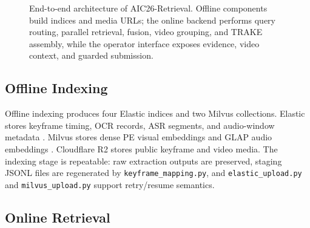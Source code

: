 \documentclass[conference]{IEEEtran}
\newcommand{\sys}{AIC26-Retrieval}
\begin{document}
\begin{figure}[t]
{
}
\caption{End-to-end architecture of \sys. Offline components build indices and
media URLs; the online backend performs query routing, parallel retrieval,
fusion, video grouping, and TRAKE assembly, while the operator interface exposes
evidence, video context, and guarded submission.}
\label{fig:system-overview}
\end{figure}

\subsection{Offline Indexing}

Offline indexing produces four Elastic indices and two Milvus collections.
Elastic stores keyframe timing, OCR records, ASR segments, and audio-window
metadata \cite{elastic2026}. Milvus stores dense PE visual embeddings and GLAP
audio embeddings \cite{milvus2026}.
Cloudflare R2 stores public keyframe and video media. The indexing stage is
repeatable: raw extraction outputs are preserved, staging JSONL files are
regenerated by \texttt{keyframe\_mapping.py}, and \texttt{elastic\_upload.py}
and \texttt{milvus\_upload.py} support retry/resume semantics.

\subsection{Online Retrieval}
\end{document}
